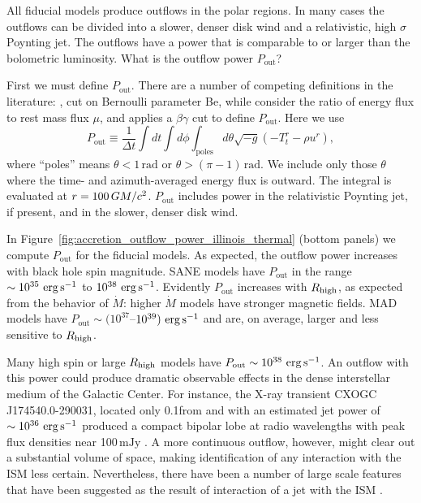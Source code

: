All fiducial models produce outflows in the polar regions.
In many cases the outflows can be divided into a slower, denser disk wind and a relativistic, high $\sigma$ Poynting jet.
The outflows have a power that is comparable to or larger than the bolometric luminosity.
What is the outflow power $P_\mathrm{out}$?

First we must define $P_\mathrm{out}$.
There are a number of competing definitions in the literature: \citet{refId0}, \citet{2014A&A...570A...7M} cut on Bernoulli parameter Be, while \citet{10.1111/j.1365-2966.2012.22002.x} consider the ratio of energy flux to rest mass flux $\mu$, and  applies a $\beta\gamma$ cut to define $P_\mathrm{out}$.
Here we use
\begin{equation}
  P_\mathrm{out} \equiv \frac{1}{\Delta t}\int dt \int d\phi \int_\mathrm{poles} d\theta \sqrt{-g}\left(-T^{r}_{t}-\rho u^{r}\right),
\end{equation}
where ``poles'' means $\theta < 1\,\mathrm{rad}$ or $\theta > (\pi-1)\,\mathrm{rad}$.  We include only those $\theta$ where the time- and azimuth-averaged energy flux is outward.
The integral is evaluated at $r = 100\,GM/c^2$.
$P_\mathrm{out}$ includes power in the relativistic Poynting jet, if present, and in the slower, denser disk wind.

In Figure~\ref{fig:accretion_outflow_power_illinois_thermal} (bottom panels) we compute $P_\mathrm{out}$ for the fiducial models.
As expected, the outflow power increases with black hole spin magnitude.
SANE models have $P_\mathrm{out}$ in the range $\sim 10^{35} \,\,\mathrm{erg}\,\mathrm{s}^{-1}$ to $10^{38} \,\,\mathrm{erg}\,\mathrm{s}^{-1}$.
Evidently $P_\mathrm{out}$ increases with $R_\mathrm{high}$, as expected from the behavior of $\dot{M}$: higher $\dot{M}$ models have stronger magnetic fields.
MAD models have $P_\mathrm{out} \sim (10^{37}$--$10^{39}) \,\,\mathrm{erg}\,\mathrm{s}^{-1}$ and are, on average, larger and less sensitive to $R_\mathrm{high}$.

Many high spin or large $R_\mathrm{high}$ models have $P_\mathrm{out} \sim 10^{38} \,\,\mathrm{erg}\,\mathrm{s}^{-1}$.
An outflow with this power could produce dramatic observable effects in the dense interstellar medium of the Galactic Center.
For instance, the X-ray transient CXOGC J174540.0-290031, located only 0.1\pc from \sgra and with an estimated jet power of $\sim 10^{36}\,\,\mathrm{erg}\,\mathrm{s}^{-1}$ produced a compact bipolar lobe at radio wavelengths with peak flux densities near 100$\,\mathrm{mJy}$ \citep{2005ApJ...633..218B}.
A more continuous  outflow, however, might clear out a substantial volume of space, making identification of any interaction with the ISM less certain.
Nevertheless, there have been a number of large scale features that have been suggested as the result of interaction of a jet with the ISM \citep[e.g.,][]{2013ApJ...779..154L,2021ApJ...922..254C}.

